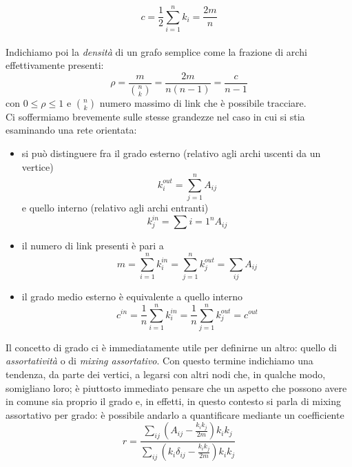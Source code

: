 \begin{equation}
 	c = \frac{1}{2} \sum_{i=1}^n k_i = \frac{2m}{n} 
\end{equation}
 \\Indichiamo poi la \emph{densità} di un grafo semplice come la frazione di archi effettivamente presenti:
\begin{equation}
	\rho = \frac{m}{\binom{n}{k}} = \frac{2m}{n\left(n-1 \right)} = \frac{c}{n-1}
\end{equation}
con $ 0 \leq \rho \leq  1 $ e  $ \binom{n}{k} $  numero massimo di link che è possibile tracciare. \\Ci soffermiamo brevemente sulle stesse grandezze nel caso in cui si stia esaminando una rete orientata:
\begin{itemize}
\item si può distinguere fra il grado esterno (relativo agli archi uscenti da un vertice)
	\begin{equation}
		k_{i}^{out} = \sum_{j=1}^n A_{ij}	
	\end{equation}
e quello interno (relativo agli archi entranti)
	\begin{equation}
		k_{j}^{in} = \sum{i=1}^n A_{ij}
	\end{equation}
\item il numero di link presenti è pari a
	\begin{equation}
		m = \sum_{i=1}^n k_i^{in} = \sum_{j=1}^n k_j^{out} = \sum_{ij} A_{ij}
	\end{equation}
\item il grado medio esterno è equivalente a quello interno
	\begin{equation}
		c^{in} = \frac{1}{n} \sum_{i=1}^n k_i^{in} = \frac{1}{n} \sum_{j=1}^n k_j^{out} = c^{out}
	\end{equation}
\end{itemize}


Il concetto di grado ci è immediatamente utile per definirne un altro: quello di \emph{assortatività} o di \emph{mixing assortativo}.
 Con questo termine indichiamo una tendenza, da parte dei vertici, a legarsi con altri nodi che, in qualche modo, somigliano loro; è piuttosto immediato pensare che un aspetto che possono avere in comune sia proprio il grado e, in effetti, in questo contesto si parla di mixing assortativo per grado: è possibile andarlo a quantificare mediante un coefficiente \cite{Newman}
\begin{equation}
	r = \frac{ \sum_{ij} \left( A_{ij} - \frac{k_i k_j}{2m} \right) k_i k_j}{\sum_{ij} \left(k_i \delta_{ij} - \frac{k_i k_j}{2m} \right) k_i k_j}
\end{equation}